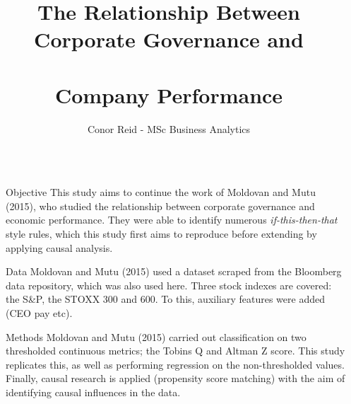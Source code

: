 \documentclass[final]{beamer}
\title{\huge{The Relationship Between Corporate Governance and \\~\\ Company Performance}} %
\author{Conor Reid - {\large MSc Business Analytics}} %
\institute{\large Supervisors - Dr. James McDermott and Dr. Miguel Nicolau} %
\newlength{\sepmargin}
\newlength{\onecolwid}
\begin{document}
  \setlength{\belowcaptionskip}{2ex} %
  \setlength\belowdisplayshortskip{1ex} %
  
\begin{frame}[t] %
\begin{columns}[t] %
\begin{column}{\sepmargin}\end{column}


\begin{column}{\onecolwid} %
	\begin{block}{Objective}
	{\large \color{black} This study aims to continue the work of Moldovan and Mutu (2015), who studied the relationship between corporate governance and economic performance. They were able to identify numerous {\it if-this-then-that} style rules, which this study first aims to reproduce before extending by applying causal analysis.   }
	\end{block}
	\begin{block}{Data}
	{\large \color{black} Moldovan and Mutu (2015) used a dataset scraped from the Bloomberg data repository, which was also used here. Three stock indexes are covered: the S\&P, the STOXX 300 and 600. To this, auxiliary features were added (CEO pay etc).   }
	\end{block}
	\begin{block}{Methods}
	{\large \color{black} Moldovan and Mutu (2015) carried out classification on two thresholded continuous metrics; the Tobins Q and Altman Z score. This study replicates this, as well as performing regression on the non-thresholded values. Finally, causal research is applied (propensity score matching) with the aim of identifying causal influences in the data. }
	\end{block}
	

\end{column}
\end{columns}
\end{frame}
\end{document}
